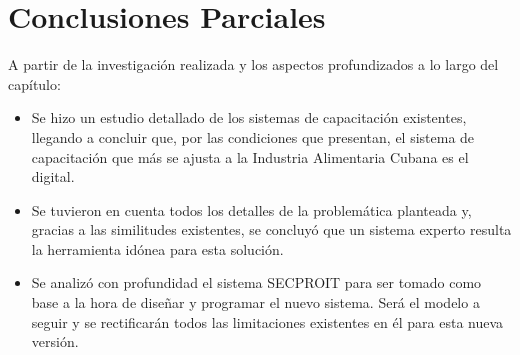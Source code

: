 \section{Conclusiones Parciales}
A partir de la investigación realizada y los aspectos profundizados a lo largo del capítulo:

\begin{itemize}
\item Se hizo un estudio detallado de los sistemas de capacitación existentes, llegando a concluir que, por las condiciones que presentan, el sistema de capacitación que más se ajusta a la Industria Alimentaria Cubana es el digital.
\item Se tuvieron en cuenta todos los detalles de la problemática planteada y, gracias a las similitudes existentes, se concluyó que un sistema experto resulta la herramienta idónea para esta solución.
\item Se analizó con profundidad el sistema SECPROIT para ser tomado como base a la hora de diseñar y programar el nuevo sistema. Será el modelo a seguir y se rectificarán todos las limitaciones existentes en él para esta nueva versión.
\end{itemize}
